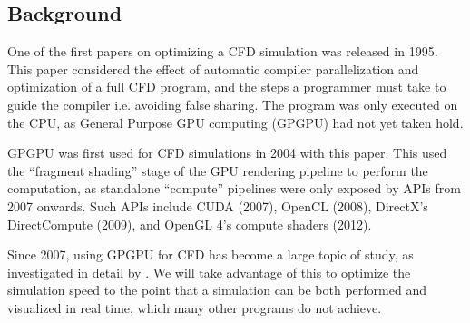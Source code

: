 \subsection{Background}
One of the first papers on optimizing a CFD simulation was released in 1995\cite{paper:1995CfdOpt:1383209}.
This paper considered the effect of automatic compiler parallelization and optimization of a full CFD program, and the steps a programmer must take to guide the compiler i.e. avoiding false sharing.
The program was only executed on the CPU, as General Purpose GPU computing (GPGPU) had not yet taken hold.

GPGPU was first used for CFD simulations in 2004 with this paper\cite{paper:2004CfdGPU:10.1109/SC.2004.26}.
This used the ``fragment shading'' stage of the GPU rendering pipeline to perform the computation, as standalone ``compute'' pipelines were only exposed by APIs from 2007 onwards.
Such APIs include CUDA (2007)\cite{tool:CUDAProgrammingV1}, OpenCL (2008)\cite{tool:OpenCL1.0PressRelease}, DirectX's DirectCompute (2009)\cite{tool:DirectComputePresentation}, and OpenGL 4's compute shaders (2012)\cite{tool:OpenGLComputeShaderExt}.

Since 2007, using GPGPU for CFD has become a large topic of study, as investigated in detail by \cite{paper:GPGPUSummary:10.1007/s11227-013-1015-7}.
We will take advantage of this to optimize the simulation speed to the point that a simulation can be both performed and visualized in real time, which many other programs do not achieve.
